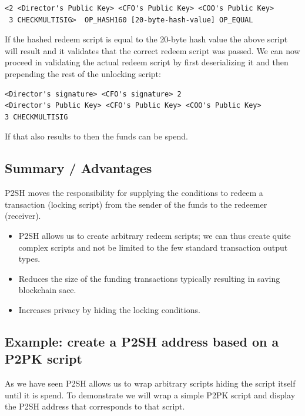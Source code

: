 \begin{emphbox}
\begin{lstlisting}[style=Pseudomath]
<2 <Director's Public Key> <CFO's Public Key> <COO's Public Key>
 3 CHECKMULTISIG>  OP_HASH160 [20-byte-hash-value] OP_EQUAL
\end{lstlisting}
\end{emphbox}

If the hashed redeem script is equal to the 20-byte hash value the above script will result  and it validates that the correct redeem script was passed. We can now proceed in validating the actual redeem script by first deserializing it and then prepending the rest of the unlocking script:

\begin{emphbox}
\begin{lstlisting}[style=Pseudomath]
<Director's signature> <CFO's signature> 2
<Director's Public Key> <CFO's Public Key> <COO's Public Key>
3 CHECKMULTISIG
\end{lstlisting}
\end{emphbox}

If that also results to  then the funds can be spend.

\subsection*{Summary / Advantages}
P2SH moves the responsibility for supplying the conditions to redeem a transaction (locking script) from the sender of the funds to the redeemer (receiver).

\begin{itemize}
\item P2SH allows us to create arbitrary redeem scripts; we can thus create quite complex scripts and not be limited to the few standard transaction output types.
\item Reduces the size of the funding transactions typically resulting in saving blockchain sace.
\item Increases privacy by hiding the locking conditions.
\end{itemize}

\subsection*{Example: create a P2SH address based on a P2PK script}
As we have seen P2SH allows us to wrap arbitrary scripts hiding the script itself until it is spend. To demonstrate we will wrap a simple P2PK script and display the P2SH address that corresponds to that script.

